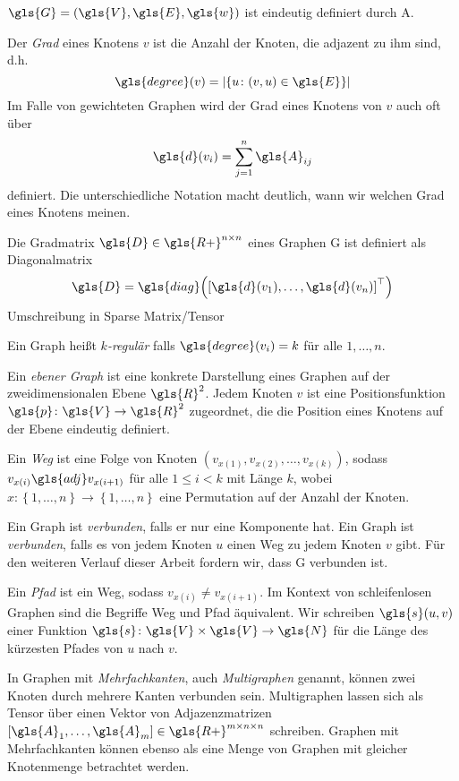 $\gls{G} = \left(\gls{V}, \gls{E}, \gls{w}\right)$ ist eindeutig definiert durch \gls{A}.

Der \emph{Grad} eines Knotens $v$ ist die Anzahl der Knoten, die adjazent zu ihm sind, d.h.
\begin{equation}
  \gls{degree}(v) = \left|\left\{ u \colon \left(v, u\right) \in \gls{E} \right\}\right|
\end{equation}
Im Falle von gewichteten Graphen wird der Grad eines Knotens von $v$ auch oft über
\begin{equation}
  \gls{d}\left(v_i\right) = \sum^n_{j=1} \gls{A}_{ij}
\end{equation}
definiert.
Die unterschiedliche Notation macht deutlich, wann wir welchen Grad eines Knotens meinen.

Die Gradmatrix $\gls{D} \in \gls{R+}^{n \times n}$ eines Graphen \gls{G} ist definiert als Diagonalmatrix
\begin{equation}
  \gls{D} = \gls{diag}\left( {\left[ \gls{d}\left(v_1\right), \ldots, \gls{d}\left(v_n\right) \right]}^{\top} \right)
\end{equation}
Umschreibung in Sparse Matrix/Tensor

Ein Graph heißt \emph{$k$-regulär} falls $\gls{degree}\left(v_i\right) = k$ für alle $1, \ldots, n$.

Ein \emph{ebener Graph} ist eine konkrete Darstellung eines Graphen auf der zweidimensionalen Ebene $\gls{R}^2$.
Jedem Knoten $v$ ist eine Positionsfunktion $\gls{p} \colon \gls{V} \to \gls{R}^2$ zugeordnet, die die Position eines Knotens auf der Ebene eindeutig definiert.

Ein \emph{Weg} ist eine Folge von Knoten $\left( v_{x\left(1\right)}, v_{x\left(2\right)}, \ldots, v_{x\left(k\right)} \right)$, sodass $v_{x\left(i\right)} \gls{adj} v_{x\left(i+1\right)}$ für alle $1 \leq i < k$ mit Länge $k$, wobei $x \colon \left\{ 1, \ldots, n \right\} \to \left\{ 1, \ldots, n \right\}$ eine Permutation auf der Anzahl der Knoten.

Ein Graph ist \emph{verbunden}, falls er nur eine Komponente hat.
Ein Graph ist \emph{verbunden}, falls es von jedem Knoten $u$ einen Weg zu jedem Knoten $v$ gibt.
Für den weiteren Verlauf dieser Arbeit fordern wir, dass \gls{G} verbunden ist.\

Ein \emph{Pfad} ist ein Weg, sodass $v_{x\left(i\right)} \neq v_{x\left(i+1\right)}$.
Im Kontext von schleifenlosen Graphen sind die Begriffe Weg und Pfad äquivalent.
Wir schreiben $\gls{s}\left(u, v\right)$ einer Funktion $\gls{s} \colon \gls{V} \times \gls{V} \to \gls{N}$ für die Länge des kürzesten Pfades von $u$ nach $v$.

In Graphen mit \emph{Mehrfachkanten}, auch \emph{Multigraphen} genannt, können zwei Knoten durch mehrere Kanten verbunden sein.
Multigraphen lassen sich als Tensor über einen Vektor von Adjazenzmatrizen $\left[\gls{A}_1, \ldots, \gls{A}_m\right] \in \gls{R+}^{m \times n \times n}$ schreiben.
Graphen mit Mehrfachkanten können ebenso als eine Menge von Graphen mit gleicher Knotenmenge betrachtet werden.
